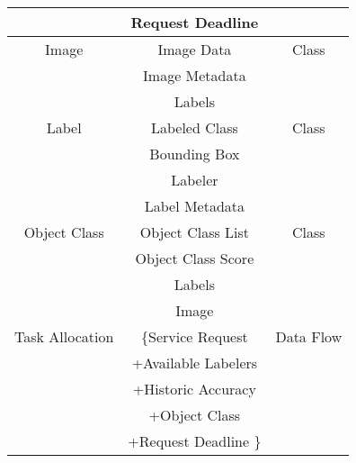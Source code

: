 \documentclass[12pt]{article}
\begin{document}
\begin{center}
\begin{tabular}{ |c|c|c| }
    &  Request Deadline & \\
    \hline
    Image &  Image Data & Class \\ 
    &  Image Metadata & \\
    &  Labels & \\
    \hline
    Label &  Labeled Class & Class \\ 
    &  Bounding Box & \\
    &  Labeler & \\
    &  Label Metadata & \\
    \hline
    Object Class &  Object Class List & Class \\ 
    &  Object Class Score & \\
    &  Labels & \\
    &  Image & \\
    \hline
    Task Allocation &  \{Service Request & Data Flow \\ 
    &  +Available Labelers & \\
    &  +Historic Accuracy & \\
    &  +Object Class & \\
    &  +Request Deadline \} & \\
    \hline
    
    
\end{tabular}
\end{center}
\end{document}
